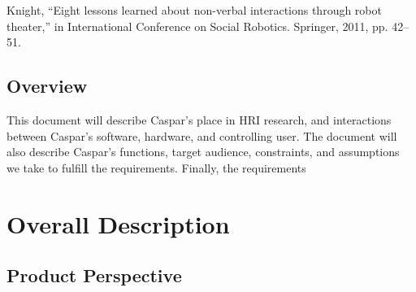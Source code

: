 \documentclass[onecolumn, draftclsnofoot,10pt, compsoc]{IEEEtran}
\begin{document}
Knight, “Eight lessons learned about non-verbal interactions through robot theater,” in International Conference on Social Robotics. Springer,
2011, pp. 42–51.

\subsection{Overview}


This document will describe Caspar’s place in HRI research, and interactions between Caspar’s software, hardware, and controlling user. The document will also describe Caspar’s functions, target audience, constraints, and assumptions we take to fulfill the requirements. Finally, the requirements

\section{Overall Description}


\subsection{Product Perspective}

\end{document}

